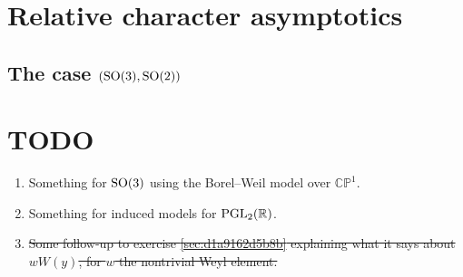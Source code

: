 \documentclass[reqno]{amsart} 
\numberwithin{equation}{section}
\begin{document}
\section{Relative character asymptotics}

\subsection{The case $(\operatorname{SO}(3), \operatorname{SO}(2))$}



\section{TODO}

\begin{enumerate}
\item Something for $\operatorname{SO}(3)$ using the Borel--Weil model over $\mathbb{C} \mathbb{P}^1$.
\item Something for induced models for $\operatorname{PGL}_2(\mathbb{R})$.
\item \sout{Some follow-up to exercise \ref{sec:d1a9162d5b8b} explaining what it says about $w W(y)$, for $w$ the nontrivial Weyl element.}
\end{enumerate}



{} 
\end{document}
